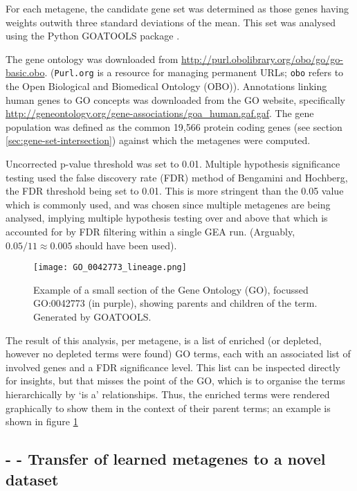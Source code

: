 \documentclass[tikz, 11pt,a4paper,oneside,fleqn, draft]{article}
\begin{document}
For each metagene, the candidate gene set was determined as those genes having weights outwith three standard deviations of the mean.   This set was analysed using the Python GOATOOLS package \cite{Klopfenstein2018}.   

The gene ontology was downloaded from \url{http://purl.obolibrary.org/obo/go/go-basic.obo}.  ({\tt Purl.org} is a resource for managing permanent URLs; {\tt obo} refers to the Open Biological and Biomedical Ontology (OBO)).  
Annotations linking human genes to GO concepts was downloaded from the GO website, specifically \url{http://geneontology.org/gene-associations/goa_human.gaf.gaf}.   
The gene population was defined as the common 19,566 protein coding genes (see section \ref{sec:gene-set-intersection}) against which the metagenes were computed.  

Uncorrected p-value threshold was set to 0.01.
Multiple hypothesis significance testing used the false discovery rate (FDR) method of Bengamini and Hochberg, the FDR threshold being set to 0.01.  This is more stringent than the 0.05 value which is commonly used, and was chosen since multiple metagenes are being analysed, implying multiple hypothesis testing over and above that which is accounted for by FDR filtering within a single GEA run.  (Arguably, $0.05 / 11 \approx 0.005$ should have been used).

\begin{figure}[htb!]
\begin{center}
\texttt{[image: GO\_0042773\_lineage.png]}
\caption{Example of a small section of the Gene Ontology (GO), focussed GO:0042773 (in purple), showing parents and children of the term.   Generated by GOATOOLS.}
\label{fig-eg_go_graphic}
\end{center}
\end{figure}

The result of this analysis, per metagene, is a list of enriched (or depleted, however no depleted terms were found) GO terms, each with an associated list of involved genes and a FDR significance level.   This list can be inspected directly for insights, but that misses the point of the GO, which is to organise the terms hierarchically by `is a' relationships.   Thus, the enriched terms were rendered graphically to show them in the context of their parent terms; an example is shown in figure \ref{fig-eg_go_graphic}


\subsection{- - Transfer of learned metagenes to a novel dataset}
\label{sec-transfer-to-novel}
\end{document}
